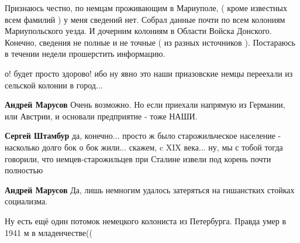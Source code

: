  
 
 
 
 

\qqSecCmt


Признаюсь честно, по немцам проживающим в Мариуполе, ( кроме известных всем
фамилий ) у меня сведений нет. Собрал данные почти по всем колониям
Мариупольского уезда. И дочерним колониям в Области Войска Донского. Конечно,
сведения не полные и не точные ( из разных источников ). Постараюсь в течении
недели прошерстить информацию.

\begin{itemize} %

о! будет просто здорово! ибо ну явно это наши приазовские немцы переехали из сельской колонии в город...

\textbf{Андрей Марусов} Очень возможно. Но если приехали напрямую из Германии, или Австрии, и основали предприятие - тоже НАШИ.

\textbf{Сергей Штамбур} да, конечно... просто ж было старожильческое население - насколько долго бок о бок жили... скажем, c XIX века... ну, мы с тобой тогда говорили, что немцев-старожильцев при Сталине извели под корень почти полностью 🙁

\textbf{Андрей Марусов} Да, лишь немногим удалось затеряться на гишанстких стойках социализма.
\end{itemize} %


Ну есть ещё один потомок немецкого колониста из Петербурга. Правда умер в 1941 м в младенчестве((

